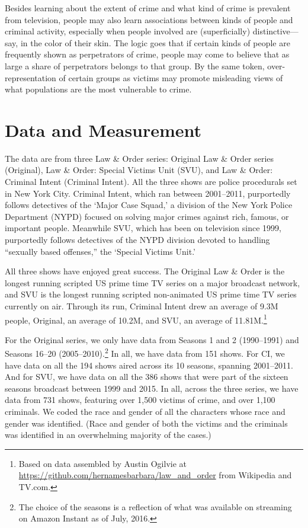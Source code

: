 \documentclass[12pt, letterpaper]{article}
\begin{document}
Besides learning about the extent of crime and what kind of crime is prevalent from television, people may also learn associations between kinds of people and criminal activity, especially when people involved are (superficially) distinctive---say, in the color of their skin. The logic goes that if certain kinds of people are frequently shown as perpetrators of crime, people may come to believe that as large a share of perpetrators belongs to that group. By the same token, over-representation of certain groups as victims may promote misleading views of what populations are the most vulnerable to crime.

\section*{Data and Measurement}
The data are from three Law \& Order series: Original Law \& Order series (Original), Law \& Order: Special Victims Unit (SVU), and Law \& Order: Criminal Intent (Criminal Intent). All the three shows are police procedurals set in New York City. Criminal Intent, which ran between 2001--2011, purportedly follows detectives of the `Major Case Squad,' a division of the New York Police Department (NYPD) focused on solving major crimes against rich, famous, or important people. Meanwhile SVU, which has been on television since 1999, purportedly follows detectives of the NYPD division devoted to handling ``sexually based offenses,'' the `Special Victims Unit.'

All three shows have enjoyed great success. The Original Law \& Order is the longest running scripted US prime time TV series on a major broadcast network, and SVU is the longest running scripted non-animated US prime time TV series currently on air. Through its run, Criminal Intent drew an average of 9.3M people, Original, an average of 10.2M, and SVU, an average of 11.81M.\footnote{Based on data assembled by Austin Ogilvie at \href{https://github.com/hernamesbarbara/law_and_order}{https://github.com/hernamesbarbara/law\_and\_order} from Wikipedia and TV.com.}

For the Original series, we only have data from Seasons 1 and 2 (1990--1991) and Seasons 16--20 (2005--2010).\footnote{The choice of the seasons is a reflection of what was available on streaming on Amazon Instant as of July, 2016.} In all, we have data from 151 shows. For CI, we have data on all the 194 shows aired across its 10 seasons, spanning 2001--2011. And for SVU, we have data on all the 386 shows that were part of the sixteen seasons broadcast between 1999 and 2015. In all, across the three series, we have data from 731 shows, featuring over 1,500 victims of crime, and over 1,100 criminals. We coded the race and gender of all the characters whose race and gender was identified. (Race and gender of both the victims and the criminals was identified in an overwhelming majority of the cases.) 
\end{document}
